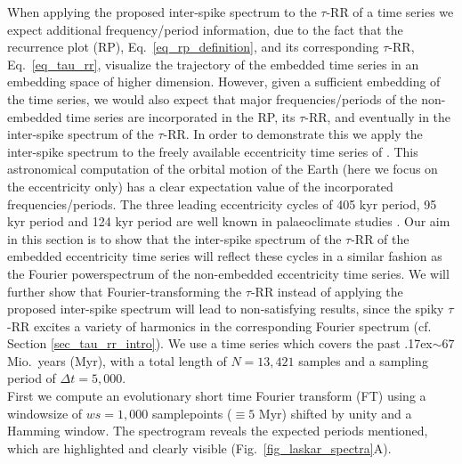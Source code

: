 \documentclass[entropy,article,submit,pdftex,moreauthors]{Definitions/mdpi}
\newcommand{\mytilde}{\raise.17ex\hbox{$\scriptstyle\mathtt{\sim}$}}
\begin{document}
When applying the proposed inter-spike spectrum to the $\tau$-RR of a time series we expect additional frequency/period information, due to the fact that the recurrence plot (RP), 
Eq.~\eqref{eq_rp_definition}, and its corresponding $\tau$-RR, Eq.~\eqref{eq_tau_rr}, visualize the trajectory of the embedded time series in an embedding space of higher dimension. 
However, given a sufficient embedding of the time series, we would also expect that major frequencies/periods of the non-embedded time series are incorporated in the RP, its $\tau$-RR, 
and eventually in the inter-spike spectrum of the $\tau$-RR. In order to demonstrate this we apply the inter-spike spectrum to the freely available eccentricity time series of \citet{Laskar2011}. 
This astronomical computation of the orbital motion of the Earth (here we focus on the eccentricity only) has a clear expectation value of the incorporated frequencies/periods. The three leading 
eccentricity cycles of 405 kyr period, 95 kyr period and 124 kyr period are well known in palaeoclimate studies \cite{Laskar2004}. Our aim in this section is to show that the inter-spike spectrum 
of the $\tau$-RR of the embedded eccentricity time series will reflect these cycles in a similar fashion as the Fourier powerspectrum of the non-embedded eccentricity time series. We will further 
show that Fourier-transforming the $\tau$-RR instead of applying the proposed inter-spike spectrum will lead to non-satisfying results, since the spiky $\tau$-RR excites a variety of harmonics in 
the corresponding Fourier spectrum (cf. Section \ref{sec_tau_rr_intro}). We use a time series which covers the past \mytilde $67$ Mio.~years (Myr), with a total length of $N=13,421$ samples and a 
sampling period of $\Delta t= 5,000$.\\
First we compute an evolutionary short time Fourier transform (FT) using a windowsize of $ws=1,000$ samplepoints ($\equiv 5$ Myr) shifted by unity and a 
Hamming window. The spectrogram reveals the expected periods mentioned, which are highlighted and clearly visible (Fig.~\ref{fig_laskar_spectra}A). 
\end{document}
